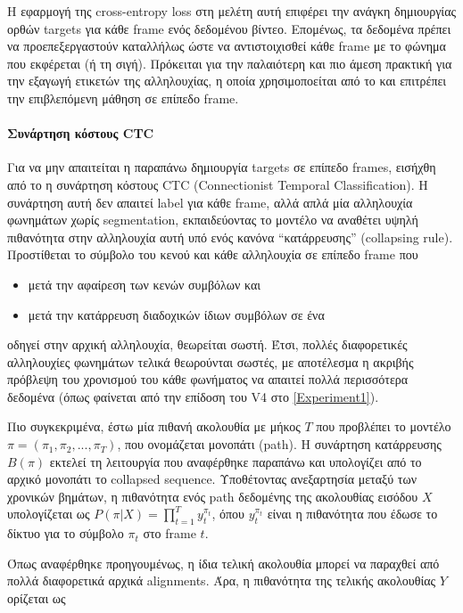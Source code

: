 Η εφαρμογή της cross-entropy loss στη μελέτη αυτή επιφέρει την ανάγκη δημιουργίας ορθών targets για κάθε frame ενός δεδομένου βίντεο. Επομένως, τα δεδομένα πρέπει να προεπεξεργαστούν καταλλήλως ώστε να αντιστοιχισθεί κάθε frame με το φώνημα που εκφέρεται (ή τη σιγή). Πρόκειται για την παλαιότερη και πιο άμεση πρακτική για την εξαγωγή ετικετών της αλληλουχίας, η οποία χρησιμοποείται από το \cite{GRAVES2005602} και επιτρέπει την επιβλεπόμενη μάθηση σε επίπεδο frame.

\paragraph{Συνάρτηση κόστους CTC}

Για να μην απαιτείται η παραπάνω δημιουργία targets σε επίπεδο frames, εισήχθη από το \cite{inproceedings} η συνάρτηση κόστους CTC (Connectionist Temporal Classification). Η συνάρτηση αυτή δεν απαιτεί label για κάθε frame, αλλά απλά μία αλληλουχία φωνημάτων χωρίς segmentation, εκπαιδεύοντας το μοντέλο να αναθέτει υψηλή πιθανότητα στην αλληλουχία αυτή υπό ενός κανόνα ``κατάρρευσης'' (collapsing rule). Προστίθεται το σύμβολο του κενού και κάθε αλληλουχία σε επίπεδο frame που

\begin{itemize}
\item μετά την αφαίρεση των κενών συμβόλων και
\item μετά την κατάρρευση διαδοχικών ίδιων συμβόλων σε ένα
\end{itemize}
οδηγεί στην αρχική αλληλουχία, θεωρείται σωστή. Έτσι, πολλές διαφορετικές αλληλουχίες φωνημάτων τελικά θεωρούνται σωστές, με αποτέλεσμα η ακριβής πρόβλεψη του χρονισμού του κάθε φωνήματος να απαιτεί πολλά περισσότερα δεδομένα (όπως φαίνεται από την επίδοση του V4 στο \ref{Experiment1}).

Πιο συγκεκριμένα, έστω μία πιθανή ακολουθία με μήκος $T$ που προβλέπει το μοντέλο $\pi = (\pi_1, \pi_2, ..., \pi_T)$, που ονομάζεται μονοπάτι (path). Η συνάρτηση κατάρρευσης $B(\pi)$ εκτελεί τη λειτουργία που αναφέρθηκε παραπάνω και υπολογίζει από το αρχικό μονοπάτι το collapsed sequence. Υποθέτοντας ανεξαρτησία μεταξύ των χρονικών βημάτων, η πιθανότητα ενός path δεδομένης της ακολουθίας εισόδου $X$ υπολογίζεται ως $P(\pi|X) = \prod_{t=1}^{T} y_{t}^{\pi_t}$, όπου $y_{t}^{\pi_t}$ είναι η πιθανότητα που έδωσε το δίκτυο για το σύμβολο $\pi_t$ στο frame $t$. 

Όπως αναφέρθηκε προηγουμένως, η ίδια τελική ακολουθία μπορεί να παραχθεί από πολλά διαφορετικά αρχικά alignments. Άρα, η πιθανότητα της τελικής ακολουθίας $Y$ ορίζεται ως

